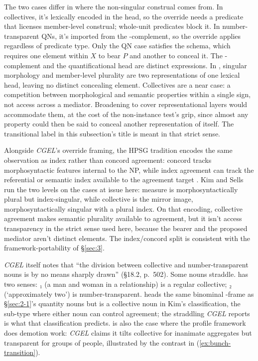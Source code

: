 The two cases differ in where the non-singular construal comes from. In collectives, it's lexically encoded in the head, so the override needs a predicate that licenses member-level construal; whole-unit predicates block it. In number-transparent QNs, it's imported from the -complement, so the override applies regardless of predicate type. Only the QN case satisfies the schema, which requires one element within $X$ to bear $P$ and another to conceal it. The -complement and the quantificational head are distinct expressions. In , singular morphology and member-level plurality are two representations of one lexical head, leaving no distinct concealing element. Collectives are a near case: a competition between morphological and semantic properties within a single sign, not access across a mediator. Broadening  to cover representational layers would accommodate them, at the cost of the non-instance test's grip, since almost any property could then be said to conceal another representation of itself. The transitional label in this subsection's title is meant in that strict sense.

Alongside \textit{CGEL}'s override framing, the HPSG tradition encodes the same observation as index rather than concord agreement: concord tracks morphosyntactic features internal to the NP, while index agreement can track the referential or semantic index available to the agreement target \autocite{wechsler-zlatic-2003-agreement,kim-2004-hybrid-agreement}. Kim and Sells \autocite*[64--65]{kim-sells-2015-binominal-nps} run the two levels on the cases at issue here: measure  is morphosyntactically plural but index-singular, while collective  is the mirror image, morphosyntactically singular with a plural index. On that encoding, collective agreement makes semantic plurality available to agreement, but it isn't access transparency in the strict sense used here, because the bearer and the proposed mediator aren't distinct elements. The index/concord split is consistent with the framework-portability of §\ref{sec:3}.

\textit{CGEL} itself notes that \enquote{the division between collective and number-transparent nouns is by no means sharply drawn} (§18.2, p.~502). Some nouns straddle.  has two senses: ₁ (a man and woman in a relationship) is a regular collective; ₂ (`approximately two') is number-transparent.  heads the same binominal -frame as §\ref{sec:2-1}'s quantity nouns but is a collective noun in Kim's \autocite*[98--103]{kim-2026-form-function} classification, the sub-type where either noun can control agreement; the straddling \textit{CGEL} reports is what that classification predicts.  is also the case where the profile framework does demotion work: \textit{CGEL} claims it tilts collective for inanimate aggregates but transparent for groups of people, illustrated by the contrast in (\ref{ex:bunch-transition}).

